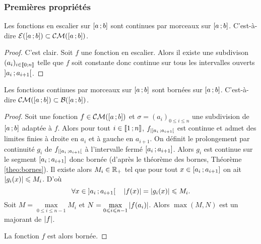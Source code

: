 \subsubsection{Premières propriétés}

\begin{prop}
  Les fonctions en escalier sur \(\left[ a \, ;  b \right]\) sont continues par 
  morceaux sur \(\left[ a \, ;  b \right]\). C'est-à-dire \(\mathcal{E}(\left[ a \, ;  b \right]) 
  \subset \mathcal{CM}(\left[ a \, ;  b \right])\).
\end{prop}
\begin{proof}
  C'est clair. Soit \(f\) une fonction en escalier. Alors il existe une 
  subdivison \((a_i)_{i \in \mathopen{\llbracket}0\mathclose{}\mathpunct{};n\mathclose{\rrbracket}}\) telle que \(f\) soit 
  constante donc continue sur tous les intervalles ouverts 
  \(\left] a_i \, ;  a_{i+1} \right[\).
\end{proof}

\begin{prop}
  Les fonctions continues par morceaux sur \(\left[ a \, ;  b \right]\) sont bornées 
  sur \(\left[ a \, ;  b \right]\). C'est-à-dire \(\mathcal{CM}(\left[ a \, ;  b \right]) \subset 
  \mathcal{B}(\left[ a \, ;  b \right])\).
\end{prop}
\begin{proof}
  Soit une fonction \(f \in \mathcal{CM}(\left[ a \, ;  b \right])\) et \(\sigma=(a_i)_{0 
  \leqslant i \leqslant n}\) une subdivision de \(\left[ a \, ;  b \right]\) adaptée 
  à \(f\). Alors pour tout \(i \in \mathopen{\llbracket}1\mathclose{}\mathpunct{};n\mathclose{\rrbracket}\), 
  \(f_{|\left] a_i \, ;  a_{i+1} \right[}\) est continue et admet des limites finies 
  à droite en \(a_{i}\) et à gauche en \(a_{i+1}\). On définit le prolongement 
  par continuité \(g_i\) de \(f_{|\left] a_i \, ;  a_{i+1} \right[}\) à l'intervalle 
  fermé \(\left[ a_i \, ;  a_{i+1} \right]\). Alors \(g_i\) est continue sur le 
  segment \(\left[ a_i \, ;  a_{i+1} \right]\) donc bornée (d'après le théorème des 
  bornes, Théorème~
  \ref{theo:bornes}). Il existe alors \(M_i \in \mathbb{R}_+\) tel que pour tout \(x \in 
  \left[ a_i \, ;  a_{i+1} \right] \) on ait \(\left\lvert g_i(x)\right\rvert \leqslant M_i\). D'où
  \begin{equation}
    \forall x \in \left] a_i \, ;  a_{i+1} \right[ \quad \left\lvert f(x)\right\rvert=\left\lvert g_i(x)\right\rvert 
    \leqslant M_i.
  \end{equation}
  Soit \(M=\max\limits_{0 \leqslant i \leqslant n-1} M_i\) et \(N=\max\limits_{0 
  \leqslant i \leqslant n-1} \left\lvert f(a_i)\right\rvert\). Alors \(\max(M,N)\) est un majorant 
  de \(\left\lvert f\right\rvert\).

  La fonction \(f\) est alors bornée.
\end{proof}

